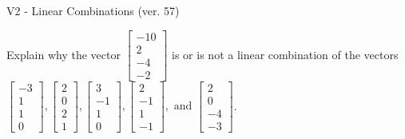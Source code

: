 \begin{exercise}
  \begin{exerciseTitle}V2 - Linear Combinations (ver. 57)\end{exerciseTitle}
  \begin{exerciseStatement}
    Explain why the vector \(\left[\begin{array}{c}
-10 \\
2 \\
-4 \\
-2
\end{array}\right]\)  is or is not a linear 
	combination of the vectors \(\left[\begin{array}{c}
-3 \\
1 \\
1 \\
0
\end{array}\right] , \left[\begin{array}{c}
2 \\
0 \\
2 \\
1
\end{array}\right] , \left[\begin{array}{c}
3 \\
-1 \\
1 \\
0
\end{array}\right] , \left[\begin{array}{c}
2 \\
-1 \\
1 \\
-1
\end{array}\right] , \text{ and } \left[\begin{array}{c}
2 \\
0 \\
-4 \\
-3
\end{array}\right]\).
	



\end{exerciseStatement}
\end{exercise}
